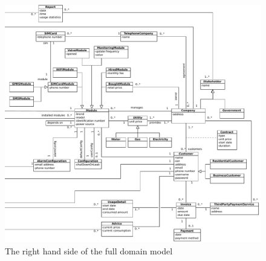 \begin{figure}[H]
	\begin{centering}
		\includegraphics[height=\textwidth]{figs/domain-model-right.pdf}
		\caption{The right hand side of the full domain model}
		\label{fig:domain-right}
	\end{centering}
\end{figure}